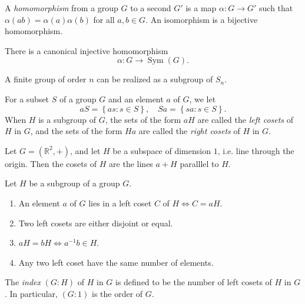 \begin{definition}
  A \emph{homomorphism} from a group \( G \) to a second \( G' \) is a map \( \alpha: G \to G' \) such that \( \alpha(ab) = \alpha(a) \alpha(b) \) for all \( a, b \in G \).
  An isomorphism is a bijective homomorphism.
\end{definition}

\begin{theorem}[Cayley]
  There is a canonical injective homomorphism
  \[
    \alpha: G \to \operatorname{Sym}(G).
  \]
\end{theorem}
\begin{corollary}
  A finite group of order \( n \) can be realized as a subgroup of \( S_n \).
\end{corollary}

For a subset \( S \) of a group \( G \) and an element \( a \) of \( G \), we let
\[
  aS = \left\lbrace as: s \in S \right\rbrace,\quad Sa = \left\lbrace sa: s \in S \right\rbrace.
\]
When \( H \) is a subgroup of \( G \), the sets of the form \( aH \) are called the \emph{left cosets} of \( H \) in \( G \), and the sets of the form \( Ha \) are called the \emph{right cosets} of \( H \) in \( G \).

\begin{example}
  Let \( G = (\mathbb{R}^2, +) \), and let \( H \) be a subspace of dimension \( 1 \), i.e. line through the origin.
  Then the cosets of \( H \) are the lines \( a + H \) paralllel to \( H \).
\end{example}

\begin{proposition}
  Let \( H \) be a subgroup of a group \( G \).
  \begin{enumerate}
    \item An element \( a \) of \( G \) lies in a left coset \( C \) of \( H \iff C = aH \).
    \item Two left cosets are either disjoint or equal.
    \item \( a H = b H \iff a^{-1}b \in H \).
    \item Any two left coset have the same number of elements.
  \end{enumerate}
\end{proposition}

\begin{definition}
  The \emph{index} \( (G: H) \) of \( H \) in \( G \) is defined to be the
  number of left cosets of \( H \) in \( G \). In particular, \( (G: 1) \) is
  the order of \( G \).
\end{definition}


